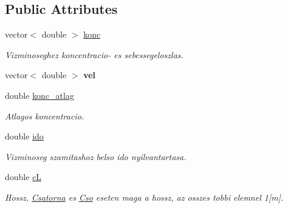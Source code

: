 \subsection*{Public Attributes}
\begin{DoxyCompactItemize}
\item 
\mbox{\label{class_agelem_ae31b4979900d8e4c254c4405b04df2a0}} 
vector$<$ double $>$ \hyperlink{class_agelem_ae31b4979900d8e4c254c4405b04df2a0}{konc}
\begin{DoxyCompactList}\small\item\em Vizminoseghez koncentracio-\/ es sebessegeloszlas. \end{DoxyCompactList}\item 
\mbox{\label{class_agelem_ae067f6cce2ca3f7d8c03c363d1ac6879}} 
vector$<$ double $>$ {\bfseries vel}
\item 
\mbox{\label{class_agelem_a23aaf89345c6b3c6ad6d90fc26b01b54}} 
double \hyperlink{class_agelem_a23aaf89345c6b3c6ad6d90fc26b01b54}{konc\+\_\+atlag}
\begin{DoxyCompactList}\small\item\em Atlagos koncentracio. \end{DoxyCompactList}\item 
\mbox{\label{class_agelem_a0cdf382c62ac004b8a120319be0cea84}} 
double \hyperlink{class_agelem_a0cdf382c62ac004b8a120319be0cea84}{ido}
\begin{DoxyCompactList}\small\item\em Vizminoseg szamitashoz belso ido nyilvantartasa. \end{DoxyCompactList}\item 
\mbox{\label{class_agelem_ab72f11ac2c7182de3a5c21943e9350a0}} 
double \hyperlink{class_agelem_ab72f11ac2c7182de3a5c21943e9350a0}{cL}
\begin{DoxyCompactList}\small\item\em Hossz, \hyperlink{class_csatorna}{Csatorna} es \hyperlink{class_cso}{Cso} eseten maga a hossz, az osszes tobbi elemnel 1\mbox{[}m\mbox{]}. \end{DoxyCompactList}\item 
\mbox{\label{class_agelem_a164f2afad3ab19d298c73a865e82aa0b}} 

\end{DoxyCompactItemize}
